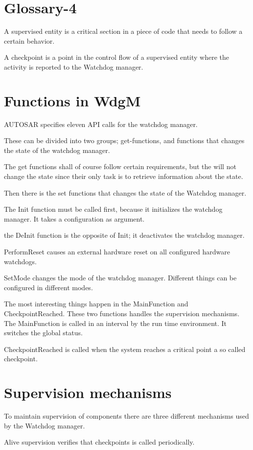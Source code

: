 \documentclass[a4paper]{article}
\begin{document}
\section{Glossary-4}
A supervised entity is a critical section in a piece of code that
needs to follow a certain behavior.

A checkpoint is a point in the control flow of a supervised entity
where the activity is reported to the Watchdog manager.

\section{Functions in WdgM}
AUTOSAR specifies eleven API calls for the watchdog manager.

These can be divided into two groups; get-functions, and functions
that changes the state of the watchdog manager.

The get functions shall of course follow certain requirements, but the
will not change the state since their only task is to retrieve
information about the state.

Then there is the set functions that changes the state of the Watchdog
manager.

The Init function must be called first, because it initializes the
watchdog manager. It takes a configuration as argument.

the DeInit function is the opposite of Init; it deactivates the
watchdog manager.

PerformReset causes an external hardware reset on all configured
hardware watchdogs.

SetMode changes the mode of the watchdog manager. Different things can
be configured in different modes.

The most interesting things happen in the MainFunction and
CheckpointReached. These two functions handles the supervision mechanisms.
The MainFunction is called in an interval by the run time environment.
It switches the global status.

CheckpointReached is called when the system reaches a critical point a
so called checkpoint.

\section{Supervision mechanisms}
To maintain supervision of components there are three different
mechanisms used by the Watchdog manager.

Alive supervision verifies that checkpoints is called periodically.
\end{document}
